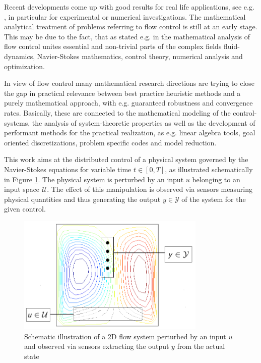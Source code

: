\documentclass[a4paper,10pt,BCOR=15mm]{scrbook}
\begin{document}
Recent developments come up with good results for real life applications, see e.g. \cite{king}, in particular for experimental or numerical investigations. The mathematical analytical treatment of problems referring to flow control is still at an early stage. This may be due to the fact, that as stated e.g. in \cite{bewley} the mathematical analysis of flow control unites essential and non-trivial parts of the complex fields fluid-dynamics, Navier-Stokes mathematics, control theory, numerical analysis and optimization.

In view of flow control many mathematical research directions are trying to close the gap in practical relevance between best practice heuristic methods and a purely mathematical approach, with e.g. guaranteed robustness and convergence rates. Basically, these are connected to the mathematical modeling of the control-systems, the analysis of system-theoretic properties as well as the development of performant methods for the practical realization, as e.g. linear algebra tools, goal oriented discretizations, problem specific codes and model reduction.

This work aims at the distributed control of a physical system governed by the Navier-Stokes equations for variable time $t\in[0,T]$, as illustrated schematically in Figure \ref{inoupic}. The physical system is perturbed by an input $u$ belonging to an input space $\mathcal U$. The effect of this manipulation is observed via sensors measuring physical quantities and thus generating the output $y\in \mathcal Y$ of the system for the given control.

\begin{figure}[htbp]
\begin{center}
 \includegraphics[width=9cm]{system.png}
 \caption{Schematic illustration of a 2D flow system perturbed by an input $u$ and observed via sensors extracting the output $y$ from the actual state }
 \label{inoupic}
\end{center}
\end{figure}
\end{document}
